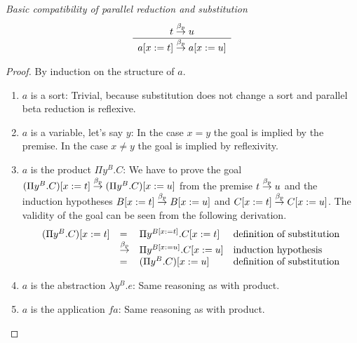 \begin{lemma}
    \label{ParallelReductionSubstitution1}
    \emph{Basic compatibility of parallel reduction and substitution}
    $$
    \begin{array}{c} 
        t \stackrel{\beta_p}{\to} u
     \\ \hline 
        a[x:=t] \stackrel{\beta_p}{\to} a[x:=u]
    \end{array}
    $$

    \begin{proof}
    By induction on the structure of $a$.
    \begin{enumerate}
    \item $a$ is a sort: Trivial, because substitution does not change a sort
    and parallel beta reduction is reflexive.

    \item $a$ is a variable, let's say $y$: In the case $x=y$ the goal is
    implied by the premise. In the case $x \ne y$ the goal is implied by
    reflexivity.

    \item $a$ is the product $\Pi y^B. C$: We have to prove the goal
    $(\Pi y^B. C)[x:=t] \stackrel{\beta_p}{\to} (\Pi y^B.C)[x:=u]$ from the premise $t \stackrel{\beta_p}{\to}
    u$ and the induction hypotheses  $B[x:=t] \stackrel{\beta_p}{\to} B[x:=u]$ and
    $C[x:=t] \stackrel{\beta_p}{\to} C[x:=u]$. The validity of the goal can be seen from the
    following derivation.
    $$
    \begin{array}{lllll}
        (\Pi y^B. C)[x:=t]
        &=& \Pi y^{B[x:=t]}. C[x:=t]
        &\text{definition of substitution}
        \\
        &\stackrel{\beta_p}{\to}& \Pi y^{B[x:=u]}. C[x:=u]
        &\text {induction hypothesis}
        \\
        &=& (\Pi y^B. C)[x:=u]
        &\text{definition of substitution}
    \end{array}
    $$

    \item $a$ is the abstraction $\lambda y^B. e$: Same reasoning as with
    product.

    \item $a$ is the application $f a$: Same reasoning as with
    product.
    \end{enumerate}
    \end{proof}
\end{lemma}


